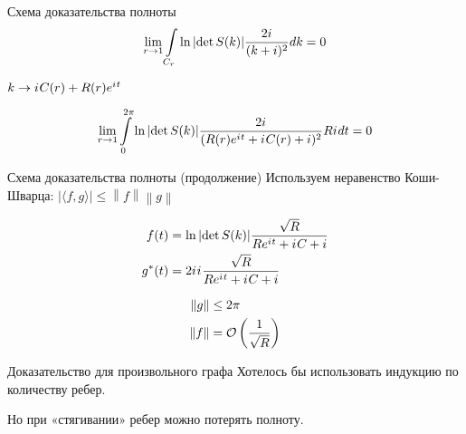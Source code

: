\documentclass{beamer}
\newcommand{\eexp}[1]{e^{#1}}
\begin{document}
\begin{frame}{Схема доказательства полноты}
\[
\lim\limits_{r \to 1} \int\limits_{C_r} \ln \abs{\det S(k)} \frac{2 {i\mkern1mu}}{(k + i)^2} dk = 0
\]

$k \to \iu C(r) + R(r) \eexp{\iu t}$

\[
\lim\limits_{r \to 1} \int\limits_{0}^{2 \pi} \ln \abs{\det S(k)} \frac{2 \iu}{(R(r) \eexp{\iu t} + \iu C(r) + i)^2} R \iu dt = 0
\]
\end{frame}



\begin{frame}{Схема доказательства полноты (продолжение)}
Используем неравенство Коши-Шварца: $\big| \langle f,g \rangle \big| \leq \left\|f\right\| \left\|g\right\|$

\begin{align*}
f(t)   &= \ln \abs{\det S(k)} \frac{\sqrt{R}}{R \eexp{\iu t} + \iu C + i} \\
g^*(t) &= 2 \iu \iu \frac{\sqrt{R}}{R \eexp{\iu t} + \iu C + i}
\end{align*}

\begin{align*}
\norm{g} &\le 2 \pi \\
\norm{f} &= \mathcal{O}\left(\frac{1}{\sqrt{R}}\right)
\end{align*}
\end{frame}

\begin{frame}{Доказательство для произвольного графа}
Хотелось бы использовать индукцию по количеству ребер.

Но при «стягивании» ребер можно потерять полноту. %
\end{frame}


\end{document}

